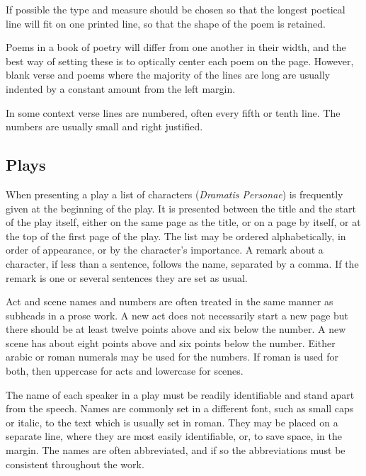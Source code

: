 \documentclass[10pt,letterpaper,extrafontsizes]{memoir}
\begin{document}
    If possible the type and measure should be chosen so that the longest
poetical line will fit on one printed line, so that the shape of the poem
is retained.

    Poems in a book of poetry will differ from one another in their width, 
and the best way of setting these is to optically center each poem on the 
page. However, blank verse and poems where the majority of the lines are
long are usually indented by a constant amount from the left margin.

    In some context verse lines are numbered, often every fifth or tenth line.
The numbers are usually small and right justified.

\subsection{Plays}

    When presenting a play a list of characters 
(\textit{Dramatis Personae})
is frequently given at the beginning of the play. It is presented between the
title and the start of the play itself, either on the same page as the title, 
or on a page by itself, or at the top of the first page of the play. The 
list may be ordered alphabetically, in order of appearance, or by the 
character's importance. A remark about a character, if less than a sentence, 
follows the name, separated by a comma. If the remark is one or several 
sentences they are set as usual.

    Act and scene 
names and numbers are often treated in the same manner as
subheads in a prose work. A new act does not necessarily start a new page
but there should be at least twelve points above and six below the number.
A new scene has about eight points above and six points below the number.
Either arabic or roman numerals may be used for the numbers. If roman
is used for both, then uppercase for acts and lowercase for scenes.

   The name of each speaker in a play must be readily 
identifiable and stand apart from the speech. Names are commonly set in a 
different font, such as small caps or italic, to the text which is usually set
in roman. They may be placed on a separate line, where they are most easily
identifiable, or, to save space, in the margin. The names are often 
abbreviated, and if so the abbreviations must be consistent throughout 
the work.
\end{document}
